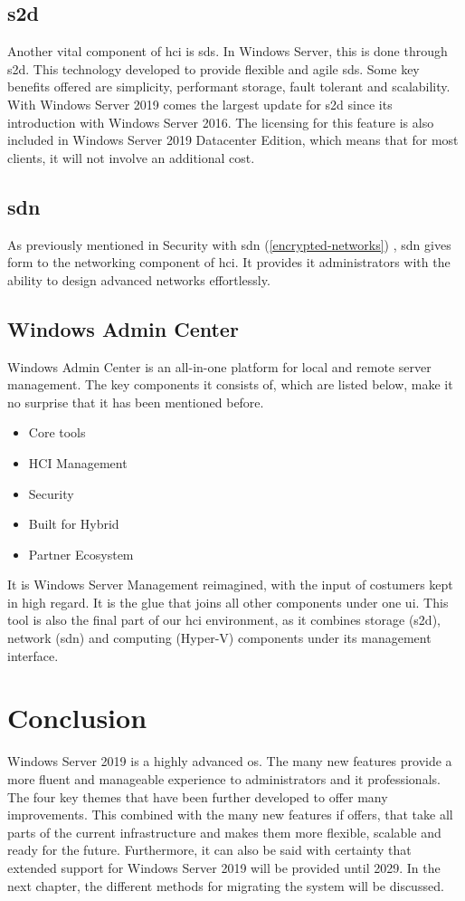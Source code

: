 \subsection{\acrfull{s2d}}
Another vital component of \acrshort{hci} is \acrfull{sds}. In Windows Server, this is done through \acrshort{s2d}. This technology developed to provide flexible and agile \acrshort{sds}. Some key benefits offered are simplicity, performant storage, fault tolerant and scalability. With Windows Server 2019 comes the largest update for \acrshort{s2d} since its introduction with Windows Server 2016. The licensing for this feature is also included in Windows Server 2019 Datacenter Edition, which means that for most clients, it will not involve an additional cost. \autocite{Gerend2018a}
\subsection{\acrshort{sdn}}
As previously mentioned in Security with \acrshort{sdn} (\ref{encrypted-networks}) , \acrshort{sdn} gives form to the networking component of \acrshort{hci}. It provides \acrshort{it} administrators with the ability to design advanced networks effortlessly.
\subsection{Windows Admin Center}
Windows Admin Center is an all-in-one platform for local and remote server management. The key components it consists of, which are listed below, make it no surprise that it has been mentioned before. 
\begin{itemize}
	\item Core tools
	\item HCI Management
	\item Security
	\item Built for Hybrid
	\item Partner Ecosystem
\end{itemize}
It is Windows Server Management reimagined, with the input of costumers kept in high regard. It is the glue that joins all other components under one \acrfull{ui}. This tool is also the final part of our \acrshort{hci} environment, as it combines storage (\acrshort{s2d}), network (\acrshort{sdn}) and computing (Hyper-V) components under its management interface. 

\section{Conclusion}

Windows Server 2019 is a highly advanced \acrshort{os}. The many new features provide a more fluent and manageable experience to administrators and \acrshort{it} professionals. The four key themes that have been further developed to offer many improvements. This combined with the many new features if offers, that take all parts of the current infrastructure and makes them more flexible, scalable and ready for the future. Furthermore, it can also be said with certainty that extended support for Windows Server 2019 will be provided until 2029. In the next chapter, the different methods for migrating the system will be discussed.

